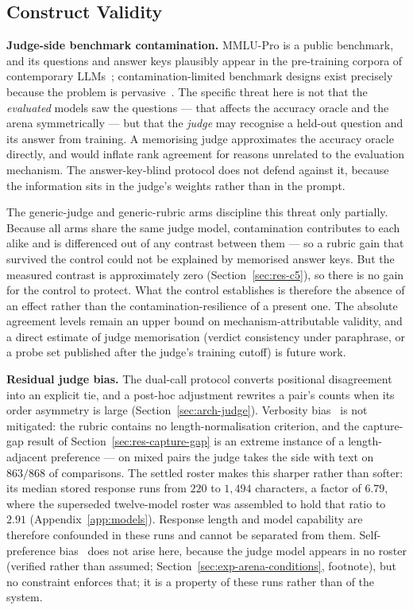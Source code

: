 \subsection{Construct Validity}\label{subsec:disc-construct-validity}

\textbf{Judge-side benchmark contamination.}
MMLU-Pro is a public benchmark, and its questions and answer keys
plausibly appear in the pre-training corpora of contemporary
LLMs~\parencite{deng2024contamination}; contamination-limited benchmark
designs exist precisely because the problem is
pervasive~\parencite{white2024livebench}.
The specific threat here is not that the \emph{evaluated} models saw
the questions --- that affects the accuracy oracle and the arena
symmetrically --- but that the \emph{judge} may recognise a held-out
question and its answer from training. A memorising judge approximates
the accuracy oracle directly, and would inflate rank agreement for
reasons unrelated to the evaluation mechanism. The answer-key-blind
protocol does not defend against it, because the information sits in
the judge's weights rather than in the prompt.

The generic-judge and generic-rubric arms discipline this threat only
partially.
Because all arms share the same judge model, contamination contributes
to each alike and is differenced out of any contrast between them --- so
a rubric gain that survived the control could not be explained by
memorised answer keys. But the measured contrast is approximately zero
(Section~\ref{sec:res-c5}), so there is
no gain for the control to protect. What the control establishes is
therefore the absence of an effect rather than the
contamination-resilience of a present one. The absolute agreement levels remain an upper bound on
mechanism-attributable validity, and a direct estimate of judge
memorisation (verdict consistency under paraphrase, or a probe set
published after the judge's training cutoff) is future work.

\textbf{Residual judge bias.}
The dual-call protocol converts positional disagreement into an
explicit tie, and a post-hoc adjustment rewrites a pair's counts when
its order asymmetry is large (Section~\ref{sec:arch-judge}). Verbosity
bias~\parencite{saito2023verbosity} is not mitigated: the rubric
contains no length-normalisation criterion, and the capture-gap result
of Section~\ref{sec:res-capture-gap} is an extreme instance of a
length-adjacent preference --- on mixed pairs the judge takes the side
with text on $863/868$ of comparisons. The settled roster makes this
sharper rather than softer: its median stored response runs from $220$
to $1{,}494$ characters, a factor of $6.79$, where the superseded
twelve-model roster was assembled to hold that ratio to $2.91$
(Appendix~\ref{app:models}). Response length and model capability are
therefore confounded in these runs and cannot be separated from them. Self-preference
bias~\parencite{panickssery2024llm} does not arise here, because the
judge model appears in no roster (verified rather than assumed;
Section~\ref{sec:exp-arena-conditions}, footnote), but no constraint
enforces that; it is a property of these runs rather than of the
system.

